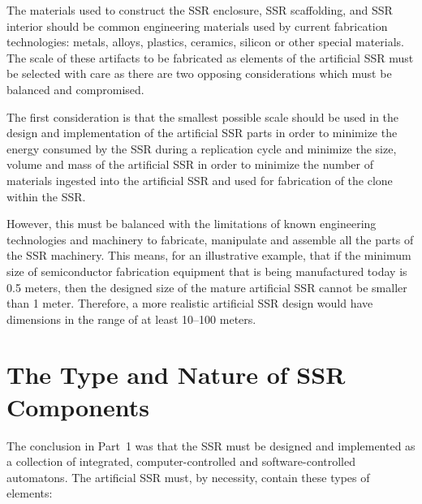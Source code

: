 The materials used to construct the SSR enclosure, SSR scaffolding, and
SSR interior should be common engineering materials used by current
fabrication technologies: metals, alloys, plastics, ceramics, silicon
or other special materials.  The scale of these artifacts to be fabricated 
as elements of the artificial SSR must be selected with care as there
are two opposing considerations which must be balanced and compromised.

The first consideration is that the 
smallest possible scale should be used in the design and
implementation of the artificial SSR parts in order to
minimize the energy consumed by the SSR during a replication cycle and minimize the size, volume and mass of the artificial SSR in order to minimize the number of materials ingested into the artificial SSR and used for fabrication of the clone within the SSR.

However, this must be balanced with the limitations of 
known engineering technologies and machinery to fabricate,
manipulate and assemble all the parts of the SSR machinery. This
means, for an illustrative example, that if the minimum size of 
semiconductor fabrication equipment that is being manufactured today is
0.5 meters, then the designed size of the mature artificial SSR cannot
be smaller than 1 meter. Therefore, a more realistic artificial
SSR design would have dimensions in the range of at least 10--100
meters.

\section{The Type and Nature of SSR Components}

The conclusion in Part~1 was that the SSR must be designed and implemented as
a collection of integrated, computer-controlled and software-controlled
automatons. 
The artificial SSR must,
by necessity, contain these types of elements:

